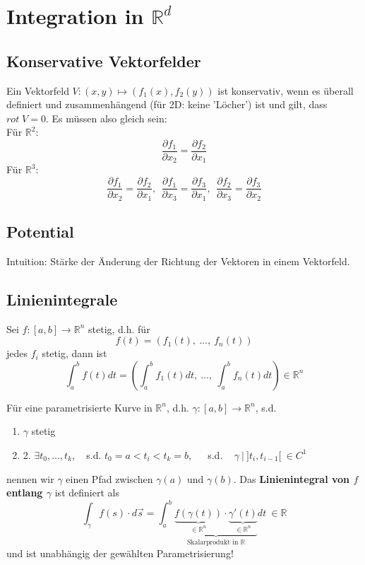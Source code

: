 \section{Integration in $\mathbb{R}^d$}

\subsection{Konservative Vektorfelder}
Ein Vektorfeld $V: (x, y) \mapsto (f_1(x), f_2(y))$ ist konservativ, wenn es überall definiert
und zusammenhängend (für 2D: keine 'Löcher') ist und gilt, dass $rot \;V = 0$. Es müssen also gleich sein:\\ 
Für $\mathbb{R}^2$:
\[ \frac{\partial f_1}{\partial x_2} = \frac{\partial f_2}{\partial x_1} \]
Für $\mathbb{R}^3$:
\[ \frac{\partial f_1}{\partial x_2} =  \frac{\partial f_2}{\partial x_1}, 
~~  \frac{\partial f_1}{\partial x_3} = \frac{\partial f_3}{\partial x_1},
~~ \frac{\partial f_2}{\partial x_3} =  \frac{\partial f_3}{\partial x_2}
\]


\subsection{Potential}

Intuition: Stärke der Änderung der Richtung der Vektoren in einem Vektorfeld.



\subsection{Linienintegrale}

Sei $f: [a, b] \rightarrow \mathbb{R}^{n}$ stetig, d.h. für
\[ f(t) = (f_1(t), ~ \ldots, ~ f_n(t)) \]
jedes $f_i$ stetig, dann ist
\[ \int_a^b f(t) dt = \left( \int_a^b f_1(t) dt, ~ \ldots , ~ \int_a^b f_n(t) dt\right) \in \mathbb{R}^n \]

Für eine parametrisierte Kurve in $\mathbb{R}^n$, d.h.
$\gamma : [a, b] \rightarrow \mathbb{R}^n$, s.d.
\begin{enumerate}
\item{ $\gamma$ stetig}
\item{2. $\exists t_0, \ldots, t_k$, ~ s.d. $t_0 = a < t_i < t_k = b$, ~~ s.d. ~
$\gamma ~ | ~ ]t_i, t_{i-1}[ ~ \in C^1$}
\end{enumerate}
nennen wir $\gamma$ einen Pfad zwischen
$\gamma(a)$ und $\gamma(b)$. 
Das \textbf{Linienintegral von $f$ entlang $\gamma$} ist definiert als
\[ \int_{\gamma} f(s)\cdot d\vec{s} = 
	\int_a^b \underbrace{\underbrace{f(\gamma(t))}_{\in\mathbb{R}^n}  \cdot 
	\underbrace{\gamma'(t)}_{\in\mathbb{R}^n}}_{\text{Skalarprodukt in } \mathbb{R}} dt  ~
	\in \mathbb{R} \]
und ist unabhängig der gewählten Parametrisierung!


